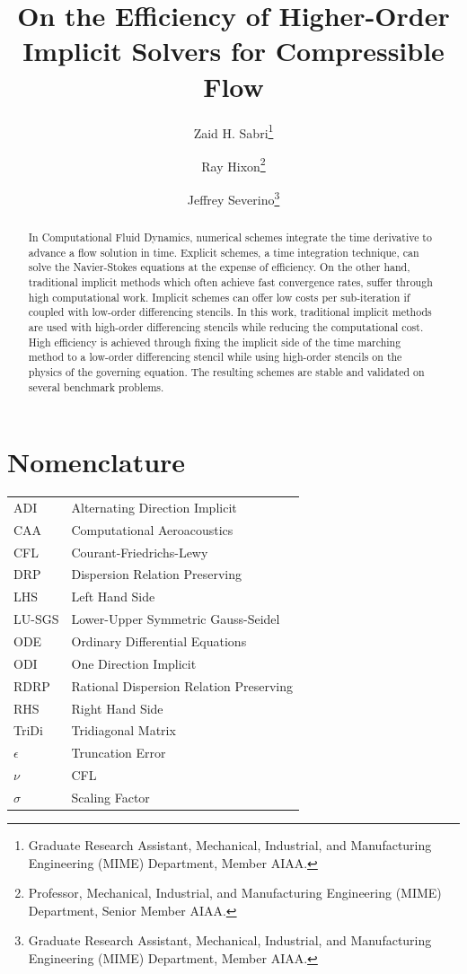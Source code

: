 \documentclass[conf]{new-aiaa}
\title{On the Efficiency of Higher-Order Implicit Solvers for Compressible Flow
}
\author{Zaid H. Sabri\footnote{Graduate Research Assistant, Mechanical, Industrial, and Manufacturing Engineering (MIME) Department, Member AIAA.}}
\author{Ray Hixon\footnote{Professor, Mechanical, Industrial, and Manufacturing Engineering (MIME) Department, Senior Member AIAA.}}
\author{Jeffrey Severino\footnote{Graduate Research Assistant, Mechanical, Industrial, and Manufacturing Engineering (MIME) Department, Member AIAA.}}
\affil{University of Toledo, Toledo, OH, 43606}
\begin{document}
\maketitle

\begin{abstract}

In Computational Fluid Dynamics, numerical schemes integrate the time derivative to advance a flow solution in time. 
Explicit schemes, a time integration technique, can solve the Navier-Stokes equations at the expense of efficiency.
On the other hand, traditional implicit methods which often achieve fast convergence rates, suffer through high computational work. 
Implicit schemes can offer low costs per sub-iteration if coupled with low-order differencing stencils. 
In this work, traditional implicit methods are used with high-order differencing stencils while reducing the computational cost. 
High efficiency is achieved through fixing the implicit side of the time marching method to a low-order differencing stencil while using high-order stencils on the physics of the governing equation. 
The resulting schemes are stable and validated on several benchmark problems.

\end{abstract}

\section{Nomenclature}

{\renewcommand\arraystretch{1.0}
\noindent\begin{longtable*}{@{}l @{\quad=\quad} l@{}}
ADI & Alternating Direction Implicit \\
CAA  & Computational Aeroacoustics \\
CFL &    Courant-Friedrichs-Lewy \\
DRP & Dispersion Relation Preserving \\
LHS & Left Hand Side \\ 
LU-SGS & Lower-Upper Symmetric Gauss-Seidel \\ 
ODE & Ordinary Differential Equations \\
ODI & One Direction Implicit \\
RDRP & Rational Dispersion Relation Preserving \\
RHS & Right Hand Side \\
TriDi & Tridiagonal Matrix \\
$\epsilon$ & Truncation Error \\
$\nu$ & CFL \\
$\sigma$ & Scaling Factor

\end{longtable*}}
\end{document}
